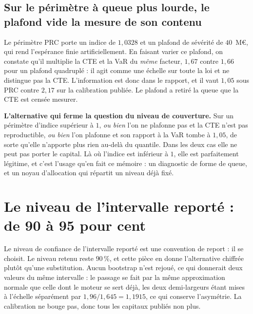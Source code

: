 \subsection*{Sur le périmètre à queue plus lourde, le plafond vide la mesure de son contenu}

Le périmètre PRC porte un indice de $1{,}0328$ et un plafond de sévérité de $40$~M\euro, qui rend
l'espérance finie artificiellement. En faisant varier ce plafond, on constate qu'il multiplie la
CTE et la VaR du \emph{même} facteur, $1{,}67$ contre $1{,}66$ pour un plafond quadruplé : il agit
comme une échelle sur toute la loi et ne distingue pas la CTE. L'information est donc dans le
rapport, et il vaut $1{,}05$ sous PRC contre $2{,}17$ sur la calibration publiée. Le plafond a
retiré la queue que la CTE est censée mesurer.

\begin{cle}
\textbf{L'alternative qui ferme la question du niveau de couverture.} Sur un périmètre d'indice
supérieur à $1$, \emph{ou bien} l'on ne plafonne pas et la CTE n'est pas reproductible, \emph{ou
bien} l'on plafonne et son rapport à la VaR tombe à $1{,}05$, de sorte qu'elle n'apporte plus rien
au-delà du quantile. Dans les deux cas elle ne peut pas porter le capital. Là où l'indice est
inférieur à $1$, elle est parfaitement légitime, et c'est l'usage qu'en fait ce mémoire : un
diagnostic de forme de queue, et un noyau d'allocation qui répartit un niveau déjà fixé.
\end{cle}

\section{Le niveau de l'intervalle reporté : de 90 à 95 pour cent}
\label{sec:ann-intervalle95}

Le niveau de confiance de l'intervalle reporté est une convention de report : il se choisit. Le
niveau retenu reste $90\,\%$, et cette pièce en donne l'alternative chiffrée plutôt qu'une
substitution. Aucun bootstrap n'est rejoué, ce qui donnerait deux valeurs du même intervalle : le
passage se fait par la même approximation normale que celle dont le moteur se sert déjà, les deux
demi-largeurs étant mises à l'échelle séparément par $1{,}96/1{,}645 = 1{,}1915$, ce qui conserve
l'asymétrie. La calibration ne bouge pas, donc tous les capitaux publiés non plus.

